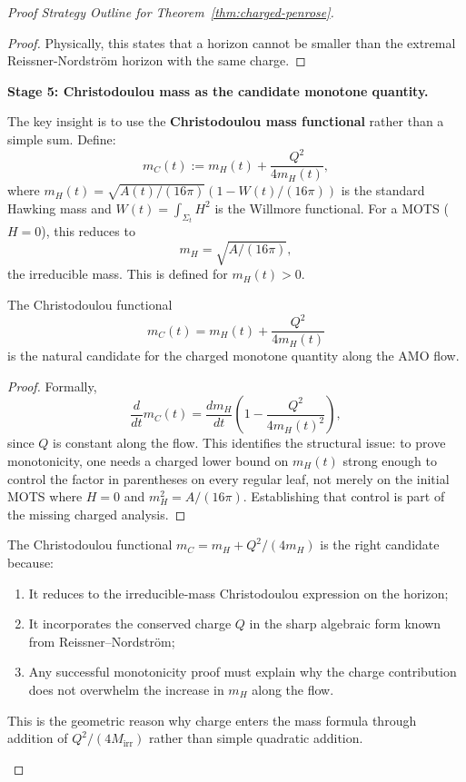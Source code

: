 \begin{proof}[Proof Strategy Outline for Theorem~\ref{thm:charged-penrose}]
\begin{proof}
Physically, this states that a horizon cannot be smaller than the extremal Reissner-Nordstr\"om horizon with the same charge.
\end{proof}

\textbf{Stage 5: Christodoulou mass as the candidate monotone quantity.}

The key insight is to use the \textbf{Christodoulou mass functional} rather than a simple sum. Define:
\begin{equation}
    m_C(t) := m_H(t) + \frac{Q^2}{4m_H(t)},
\end{equation}
where $m_H(t) = \sqrt{A(t)/(16\pi)}(1 - W(t)/(16\pi))$ is the standard Hawking mass and $W(t) = \int_{\Sigma_t} H^2$ is the Willmore functional. For a MOTS ($H=0$), this reduces to 
\[
m_H = \sqrt{A/(16\pi)},
\]
the irreducible mass. This is defined for $m_H(t) > 0$.

\begin{lemma}\label{lem:mC-monotone}
The Christodoulou functional
\[
m_C(t)=m_H(t)+\frac{Q^2}{4m_H(t)}
\]
is the natural candidate for the charged monotone quantity along the AMO flow.
\end{lemma}

\begin{proof}
Formally,
\[
\frac{d}{dt}m_C(t)=\frac{d m_H}{dt}\left(1-\frac{Q^2}{4m_H(t)^2}\right),
\]
since $Q$ is constant along the flow. This identifies the structural issue: to prove monotonicity, one needs a charged lower bound on $m_H(t)$ strong enough to control the factor in parentheses on every regular leaf, not merely on the initial MOTS where $H=0$ and $m_H^2=A/(16\pi)$. Establishing that control is part of the missing charged analysis.
\end{proof}

\begin{remark}
The Christodoulou functional $m_C = m_H + Q^2/(4m_H)$ is the right candidate because:
\begin{enumerate}
    \item It reduces to the irreducible-mass Christodoulou expression on the horizon;
    \item It incorporates the conserved charge $Q$ in the sharp algebraic form known from Reissner--Nordstr\"om;
    \item Any successful monotonicity proof must explain why the charge contribution does not overwhelm the increase in $m_H$ along the flow.
\end{enumerate}
This is the geometric reason why charge enters the mass formula through addition of $Q^2/(4M_{\mathrm{irr}})$ rather than simple quadratic addition.
\end{remark}


\end{proof}
